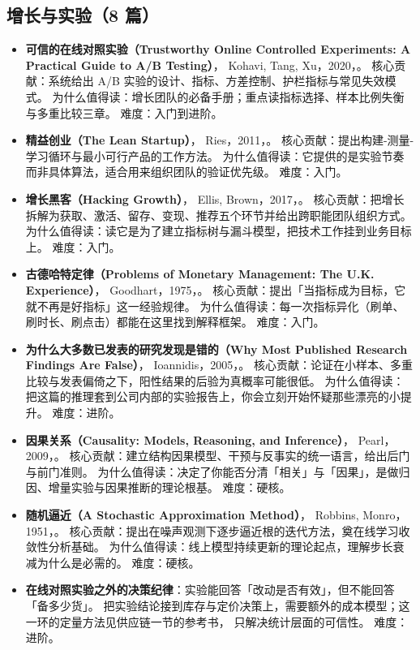 \subsection{增长与实验（8 篇）}

\begin{itemize}
  \item \textbf{可信的在线对照实验（Trustworthy Online Controlled Experiments: A Practical Guide to A/B Testing）}，
        Kohavi, Tang, Xu，2020，\cite{kohavi2020trustworthy}。
        核心贡献：系统给出 A/B 实验的设计、指标、方差控制、护栏指标与常见失效模式。
        为什么值得读：增长团队的必备手册；重点读指标选择、样本比例失衡与多重比较三章。
        难度：入门到进阶。
  \item \textbf{精益创业（The Lean Startup）}，
        Ries，2011，\cite{ries2011lean}。
        核心贡献：提出构建-测量-学习循环与最小可行产品的工作方法。
        为什么值得读：它提供的是实验节奏而非具体算法，适合用来组织团队的验证优先级。
        难度：入门。
  \item \textbf{增长黑客（Hacking Growth）}，
        Ellis, Brown，2017，\cite{ellis2021growth}。
        核心贡献：把增长拆解为获取、激活、留存、变现、推荐五个环节并给出跨职能团队组织方式。
        为什么值得读：读它是为了建立指标树与漏斗模型，把技术工作挂到业务目标上。
        难度：入门。
  \item \textbf{古德哈特定律（Problems of Monetary Management: The U.K. Experience）}，
        Goodhart，1975，\cite{goodhart1975}。
        核心贡献：提出「当指标成为目标，它就不再是好指标」这一经验规律。
        为什么值得读：每一次指标异化（刷单、刷时长、刷点击）都能在这里找到解释框架。
        难度：入门。
  \item \textbf{为什么大多数已发表的研究发现是错的（Why Most Published Research Findings Are False）}，
        Ioannidis，2005，\cite{ioannidis2005why}。
        核心贡献：论证在小样本、多重比较与发表偏倚之下，阳性结果的后验为真概率可能很低。
        为什么值得读：把这篇的推理套到公司内部的实验报告上，你会立刻开始怀疑那些漂亮的小提升。
        难度：进阶。
  \item \textbf{因果关系（Causality: Models, Reasoning, and Inference）}，
        Pearl，2009，\cite{pearl2009causality}。
        核心贡献：建立结构因果模型、干预与反事实的统一语言，给出后门与前门准则。
        为什么值得读：决定了你能否分清「相关」与「因果」，是做归因、增量实验与因果推断的理论根基。
        难度：硬核。
  \item \textbf{随机逼近（A Stochastic Approximation Method）}，
        Robbins, Monro，1951，\cite{robbins1951stochastic}。
        核心贡献：提出在噪声观测下逐步逼近根的迭代方法，奠在线学习收敛性分析基础。
        为什么值得读：线上模型持续更新的理论起点，理解步长衰减为什么是必需的。
        难度：硬核。
  \item \textbf{在线对照实验之外的决策纪律}：实验能回答「改动是否有效」，但不能回答「备多少货」。
        把实验结论接到库存与定价决策上，需要额外的成本模型；这一环的定量方法见供应链一节的参考书，
        \cite{kohavi2020trustworthy} 只解决统计层面的可信性。
        难度：进阶。
\end{itemize}

